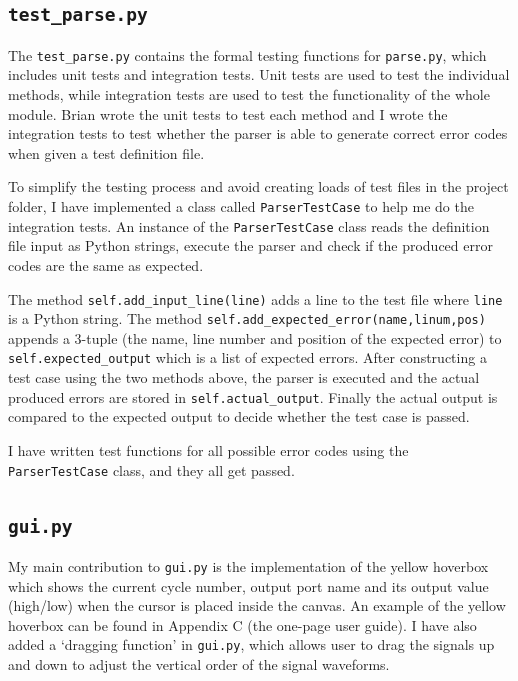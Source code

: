 \documentclass[10pt,a4paper]{article}
\begin{document}
\subsection{\texttt{test\_parse.py}}
\label{sec:orgecf216b}

The \texttt{test\_parse.py} contains the formal testing functions for
\texttt{parse.py}, which includes unit tests and integration tests. Unit
tests are used to test the individual methods, while integration tests
are used to test the functionality of the whole module. Brian wrote
the unit tests to test each method and I wrote the integration tests
to test whether the parser is able to generate correct error codes
when given a test definition file.

To simplify the testing process and avoid creating loads of test files
in the project folder, I have implemented a class called
\texttt{ParserTestCase} to help me do the integration tests. An instance of the
\texttt{ParserTestCase} class reads the definition file input as Python
strings, execute the parser and check if the produced error codes are
the same as expected.

The method \texttt{self.add\_input\_line(line)} adds a line to the test file
where \texttt{line} is a Python string. The method
\texttt{self.add\_expected\_error(name,linum,pos)} appends a 3-tuple (the name,
line number and position of the expected error) to
\texttt{self.expected\_output} which is a list of expected errors. After
constructing a test case using the two methods above, the parser is
executed and the actual produced errors are stored in
\texttt{self.actual\_output}. Finally the actual output is compared to the
expected output to decide whether the test case is passed.

I have written test functions for all possible error codes using the
\texttt{ParserTestCase} class, and they all get passed. 

\subsection{\texttt{gui.py}}
\label{sec:org8a7a4c1}

My main contribution to \texttt{gui.py} is the implementation of the yellow
hoverbox which shows the current cycle number, output port name and
its output value (high/low) when the cursor is placed inside the
canvas. An example of the yellow hoverbox can be found in Appendix C
(the one-page user guide). I have also added a `dragging function' in
\texttt{gui.py}, which allows user to drag the signals up and down to adjust
the vertical order of the signal waveforms.
\end{document}
